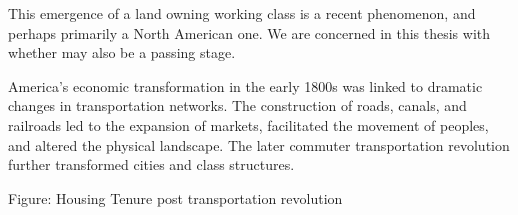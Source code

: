 This emergence of a land owning working class is a recent phenomenon, and perhaps primarily a North American one. We are concerned in this thesis with whether may also be a passing stage.

America's economic transformation in the early 1800s was linked to dramatic changes in transportation networks. The construction of roads, canals, and railroads led to the expansion of markets, facilitated the movement of peoples, and altered the physical landscape. The later commuter transportation revolution further transformed cities and class structures.

\begin{center}

Figure: Housing Tenure post transportation revolution
\end{center}






